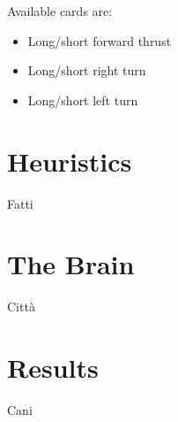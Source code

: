 \documentclass[12pt]{report}
\begin{document}
Available cards are:
\begin{itemize}
    \item Long/short forward thrust
    \item Long/short right turn
    \item Long/short left turn
\end{itemize}

\chapter{Heuristics}
Fatti
\chapter{The Brain}
Città
\chapter{Results}
Cani
\end{document}
